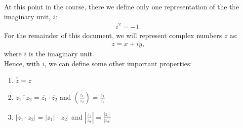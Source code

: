 \documentclass{article}
\newcommand{\gap}{\medskip\\}
\newcommand{\ds}{\displaystyle}
\begin{document}
    At this point in the course, there we define only one representation of the 
    the imaginary unit, $i$:
    \begin{align*}
        i^2 = -1.
    \end{align*}
    For the remainder of this document, we will represent complex numbers $z$ as:
    \begin{align*}
        z = x + iy,
    \end{align*}
    where $i$ is the imaginary unit.
    \gap
    Hence, with $i$, we can define some other important properties:
    \begin{enumerate}
        \item $\ds \overline{\overline{z}} = z$
        \item $\ds \overline{z_1 \cdot z_2} = \overline{z_1}\cdot \overline{z_2}$ and
        $\ds \overline{\left(\frac{z_1}{z_2}\right)} = \frac{\overline{z_1}}{\overline{z_2}}$
        \item $\ds |z_1 \cdot z_2 | = |z_1| \cdot |z_2|$ and $\ds \left| \frac{z_1}{z_2} \right| = \frac{|z_1|}{|z_2|}$
    \end{enumerate}
\end{document}
